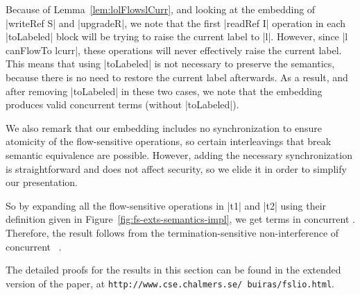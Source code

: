 \begin{proofsketch} Because of Lemma~\ref{lem:lolFlowslCurr}, and
  looking at the embedding of |writeRef S| and |upgradeR|, we note
  that the first |readRef I| operation in each |toLabeled| block will
  be trying to raise the current label to |l|. However, since |l
  canFlowTo lcurr|, these operations will never effectively raise the
  current label. This means that using |toLabeled| is not necessary to
  preserve the semantics, because there is no need to restore the
  current label afterwards. As a result, and after removing
  |toLabeled| in these two cases, we note that the embedding produces
  valid concurrent \lio{} terms (without |toLabeled|).

  We also remark that our embedding includes no synchronization to
  ensure atomicity of the flow-sensitive operations, so certain
  interleavings that break semantic equivalence are possible. However,
  adding the necessary synchronization is straightforward and does not
  affect security, so we elide it in order to simplify our presentation.

  So by expanding all the flow-sensitive operations in |t1| and |t2|
  using their definition given in
  Figure~\ref{fig:fs-exts-semantics-impl}, we get terms in concurrent
  \lio{}.  Therefore, the result follows from the
  termination-sensitive non-interference of concurrent
  \lio{}~\citep{stefan:addressing-covert}.
\end{proofsketch}

The detailed proofs for the results in this section can be found in
the extended version of the paper, at
\texttt{http://www.cse.chalmers.se/~buiras/fslio.html}.


